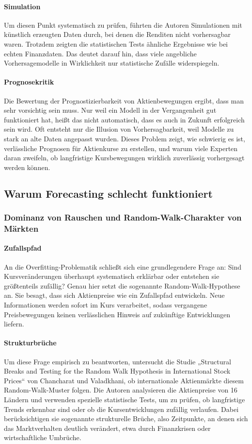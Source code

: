 \paragraph{Simulation}
Um diesen Punkt systematisch zu prüfen, führten die Autoren Simulationen mit künstlich erzeugten Daten durch, bei denen die Renditen nicht vorhersagbar waren. Trotzdem zeigten die statistischen Tests ähnliche Ergebnisse wie bei echten Finanzdaten. Das deutet darauf hin, dass viele angebliche Vorhersagemodelle in Wirklichkeit nur statistische Zufälle widerspiegeln.
\paragraph{Prognosekritik}
Die Bewertung der Prognostizierbarkeit von Aktienbewegungen ergibt, dass man sehr vorsichtig sein muss. Nur weil ein Modell in der Vergangenheit gut funktioniert hat, heißt das nicht automatisch, dass es auch in Zukunft erfolgreich sein wird. Oft entsteht nur die Illusion von Vorhersagbarkeit, weil Modelle zu stark an alte Daten angepasst wurden. Dieses Problem zeigt, wie schwierig es ist, verlässliche Prognosen für Aktienkurse zu erstellen, und warum viele Experten daran zweifeln, ob langfristige Kursbewegungen wirklich zuverlässig vorhergesagt werden können.

\subsection{Warum Forecasting schlecht funktioniert}
\subsubsection{Dominanz von Rauschen und Random-Walk-Charakter von Märkten}
\paragraph{Zufallspfad}
An die Overfitting-Problematik schließt sich eine grundlegendere Frage an: Sind Kursveränderungen überhaupt systematisch erklärbar oder entstehen sie größtenteils zufällig? Genau hier setzt die sogenannte Random-Walk-Hypothese an. Sie besagt, dass sich Aktienpreise wie ein Zufallspfad entwickeln. Neue Informationen werden sofort im Kurs verarbeitet, sodass vergangene Preisbewegungen keinen verlässlichen Hinweis auf zukünftige Entwicklungen liefern.
\paragraph{Strukturbrüche}
Um diese Frage empirisch zu beantworten, untersucht die Studie „Structural Breaks and Testing for the Random Walk Hypothesis in International Stock Prices“ von Chancharat und Valadkhani, ob internationale Aktienmärkte diesem Random-Walk-Muster folgen. Die Autoren analysieren die Aktienpreise von 16 Ländern und verwenden spezielle statistische Tests, um zu prüfen, ob langfristige Trends erkennbar sind oder ob die Kursentwicklungen zufällig verlaufen. Dabei berücksichtigen sie sogenannte strukturelle Brüche, also Zeitpunkte, an denen sich das Marktverhalten deutlich verändert, etwa durch Finanzkrisen oder wirtschaftliche Umbrüche.
